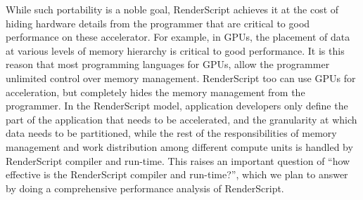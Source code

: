 While such portability is a noble goal, RenderScript achieves it at the cost of
hiding hardware details from the programmer that are critical to good
performance on these accelerator. For example, in GPUs, the placement of data at
various levels of memory hierarchy is critical to good performance.
It is this reason that most programming languages for GPUs, allow the programmer
unlimited control over memory management. RenderScript too can use GPUs for acceleration, but
completely hides the memory management from the programmer. In the RenderScript
model, application developers only define the part of the application that needs
to be accelerated, and the granularity at which data needs to be partitioned,
while the rest of the responsibilities of memory management and work distribution
among different compute units is handled by RenderScript compiler and run-time.
This raises an important
question of ``how effective is the RenderScript compiler and run-time?'', which
we plan to answer by doing a comprehensive performance analysis of RenderScript.

%
%
%

